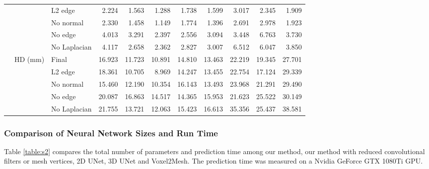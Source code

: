 \documentclass[times,review,preprint,authoryear]{elsarticle}
\begin{document}
\begin{table}[H]
{{\begin{tabular}{lllrrrrrrrr}
   &         & L2 edge &   2.224 &   1.563 &   1.288 &   1.738 &   1.599 &   3.017 &   2.345 &   1.909 \\
   &         & No normal &   2.330 &   1.458 &   1.149 &   1.774 &   1.396 &   2.691 &   2.978 &   1.923 \\
   &         & No edge &   4.013 &   3.291 &   2.397 &   2.556 &   3.094 &   3.448 &   6.763 &   3.730 \\
   &         & No Laplacian &   4.117 &   2.658 &   2.362 &   2.827 &   3.007 &   6.512 &   6.047 &   3.850 \\
\cline{2-11}
   & \multirow{5}{*}{HD (mm)} & Final &  16.923 &  11.723 &  10.891 &  14.810 &  13.463 &  22.219 &  19.345 &  27.701 \\
   &         & L2 edge &  18.361 &  10.705 &   8.969 &  14.247 &  13.455 &  22.754 &  17.124 &  29.339 \\
   &         & No normal &  15.460 &  12.190 &  10.354 &  16.143 &  13.493 &  23.968 &  21.291 &  29.490 \\
   &         & No edge &  20.087 &  16.863 &  14.517 &  14.365 &  15.953 &  21.623 &  25.522 &  30.149 \\
   &         & No Laplacian &  21.755 &  13.721 &  12.063 &  15.423 &  16.613 &  35.356 &  25.437 &  38.581 \\
\bottomrule
\end{tabular}
}}
\end{table}

\subsubsection{Comparison of Neural Network Sizes and Run Time}
Table \ref{table:s2} compares the total number of parameters and prediction time among our method, our method with reduced convolutional filters or mesh vertices, 2D UNet, 3D UNet and Voxel2Mesh. The prediction time was measured on a Nvidia GeForce GTX 1080Ti GPU.
\begin{table}[H]
\caption{A comparison of neural network sizes and the average prediction time among our methods, 2D UNet, 3D UNet and Voxel2Mesh. }\label{table:s2}
\end{table}



\end{document}
